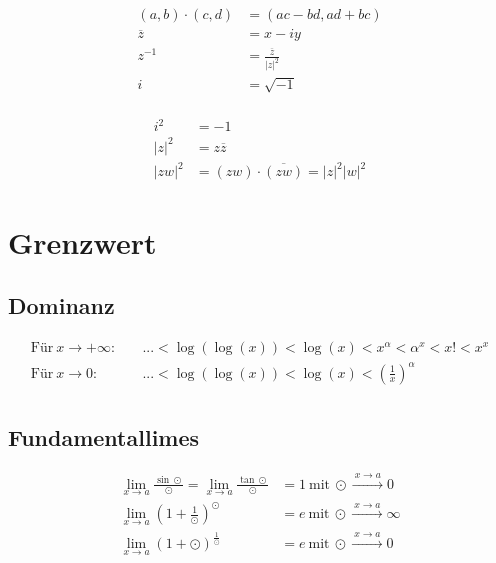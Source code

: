 \begin{minipage}[c]{0.5\textwidth}
\begin{equation*}
\begin{split}
	(a,b) \cdot (c, d) & = (ac-bd, ad+bc) \\
	\overline{z} & = x - iy\\
	z^{-1} & = \frac{\overline{z}}{|z|^2} \\
	i & = \sqrt{-1}\\
\end{split}
\end{equation*}
\end{minipage}
%
\begin{minipage}[c]{0.5\textwidth}
\begin{equation*}
\begin{split}
	i^2 & = -1 \\
	|z|^2 & = z\overline{z} \\
	|zw|^2 & = (zw) \cdot \overline{(zw)} = |z|^2|w|^2
\end{split}
\end{equation*}
\end{minipage}

\section{Grenzwert}

\subsection{Dominanz}

\begin{equation*}
\begin{split}
	\text{F{\"u}r}\ x \to +\infty:\quad & ... < \log(\log(x)) < \log(x) < x^\alpha < \alpha^x < x! < x^x \\
	\text{F{\"u}r}\ x \to 0:\quad & ... < \log(\log(x)) < \log(x) < (\frac{1}{x})^\alpha \\
\end{split}
\end{equation*}

\subsection{Fundamentallimes}

\begin{equation*}
\begin{split}
	\lim_{x \to a} \frac{\sin \odot}{\odot} = \lim_{x \to a} \frac{\tan \odot}{\odot} & = 1\ \text{mit}\ \odot \xrightarrow{\: x \to a \: } 0 \\ 
	\lim_{x \to a} (1 + \frac{1}{\odot})^\odot & = e\ \text{mit}\ \odot \xrightarrow{\: x \to a \: } \infty \\ 
	\lim_{x \to a} (1 + \odot)^\frac{1}{\odot} & = e\ \text{mit}\ \odot \xrightarrow{\: x \to a \: } 0 \\ 
\end{split}
\end{equation*}

